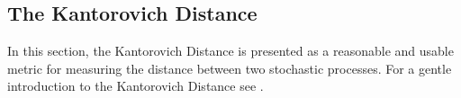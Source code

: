 \begin{comment}
The most common way to think about stochastic processes is, however, in terms of its probability measure $\mathbb{P}$.
For the purpose of this discussion, let $\Omega=\mathbb{R}^n$ and $\zeta=id$.
Each of the elements of the stochastic process except for the probability measure is fixed, and the stochastic process is considered in terms of the space of probability measures.
This interpretation will be followed throughout this paper.

The choice of the space of probability measures as the underlying space for stochastic processes leads to much more difficulties when defining a metric.
It is not feasible to regard two probability measures $\mathbb{P}_1$ and $\mathbb{P}_2$ as integrable functions and elements of $L^p$ for two reasons:
\begin{enumerate}
\item The metric between two stochastic processes $\xi_1$ and $\xi_2$ would be defined in terms of the $L^p$-norm between their probability measures $\mathbb{P}_1$ and $\mathbb{P}_2$:
  \begin{equation}
    \label{eq:prob-measure-metric-as-Lpnorm}
    D(\mathbb{P}_1,\mathbb{P}_2) := \left\Vert \mathbb{P}_1-\mathbb{P}_2\right\Vert = \sum_{t=1}^T\int_{\omega\in\Omega}\left\Vert \mathbb{P}_{1,t}(\omega)-\mathbb{P}_{2,t}(\omega)\right\Vert
  \end{equation}
  This does, however, not yield meaningful results.
See figure \ref{fig:example-wrong-distance} for an example.
\item The definition of the above metric makes use of the point wise difference of $\mathbb{P}_1$ and $\mathbb{P}_2$
  This difference is, however, not a meaningful construction, since the difference of two probability measure functions is itself \textbf{never} a probability measure.
\end{enumerate}

\end{comment}
\subsection{The Kantorovich Distance}
\label{sec:kantoro}
In this section, the Kantorovich Distance is presented as a reasonable and usable metric for measuring the distance between two stochastic processes.
For a gentle introduction to the Kantorovich Distance see .

